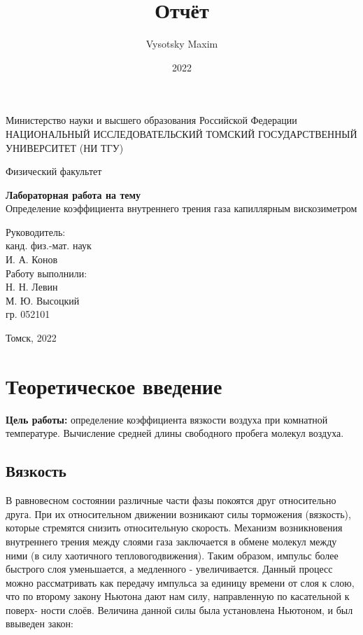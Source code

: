 \documentclass[a4paper,12pt]{article}
\author{Vysotsky Maxim}
\title{Отчёт}
\date{2022}
\begin{document}
\begin{titlepage}
	\begin{center}
		{Министерство науки и высшего образования Российской Федерации
			НАЦИОНАЛЬНЫЙ ИССЛЕДОВАТЕЛЬСКИЙ ТОМСКИЙ
			ГОСУДАРСТВЕННЫЙ УНИВЕРСИТЕТ (НИ ТГУ)}
	\end{center}
	\begin{center}
		{Физический факультет}
	\end{center}
	
	
	\vspace{8cm}
	{
		\begin{center}
			{\bf Лабораторная работа на тему}\\
			Определение коэффициента внутреннего трения газа
			капиллярным вискозиметром
		\end{center}
	}
	\vspace{2cm}
	\begin{flushright}
		{Руководитель:\\ канд. физ.-мат. наук\\
			И. А. Конов\\
			Работу выполнили:\\
			Н. Н. Левин\\
			М. Ю. Высоцкий\\
			\vspace{0.2cm}
			гр. 052101}
	\end{flushright}
	\vspace{3cm}
	\begin{center}
		Томск, 2022
	\end{center}
\end{titlepage}

\section{Теоретическое введение}
\textbf{Цель работы:} определение коэффициента вязкости воздуха при
комнатной температуре. Вычисление средней длины свободного
пробега молекул воздуха.

\subsection{Вязкость}
В равновесном состоянии различные части фазы покоятся друг относительно друга. При их относительном движении возникают силы торможения (вязкость), которые стремятся снизить относительную скорость. Механизм возникновения внутреннего трения между слоями газа заключается в обмене молекул между ними (в силу хаотичного тепловогодвижения). Таким образом, импульс более быстрого слоя уменьшается, а
медленного - увеличивается. Данный процесс можно рассматривать как
передачу импульса за единицу времени от слоя к слою, что по второму
закону Ньютона дают нам силу, направленную по касательной к поверх-
ности слоёв. Величина данной силы была установлена Ньютоном, и был
ввыведен закон:
\end{document}
